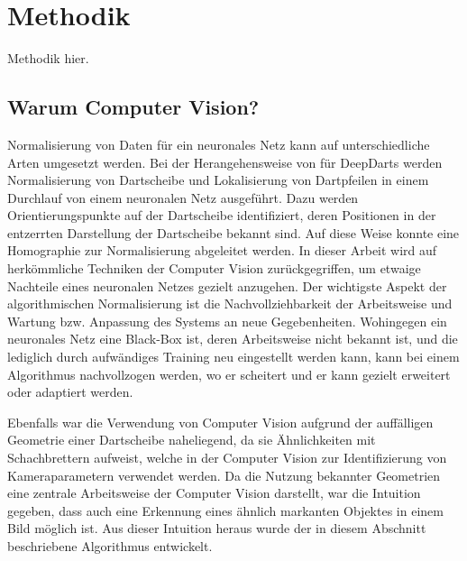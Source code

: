 
\section{Methodik}
\label{sec:cv:methodik}

Methodik hier.


\subsection{Warum Computer Vision?}
\label{sec:warum_cv}

Normalisierung von Daten für ein neuronales Netz kann auf unterschiedliche Arten umgesetzt werden. Bei der Herangehensweise von \citeauthor{deepdarts} für DeepDarts werden Normalisierung von Dartscheibe und Lokalisierung von Dartpfeilen in einem Durchlauf von einem neuronalen Netz ausgeführt. Dazu werden Orientierungspunkte auf der Dartscheibe identifiziert, deren Positionen in der entzerrten Darstellung der Dartscheibe bekannt sind. Auf diese Weise konnte eine Homographie zur Normalisierung abgeleitet werden. In dieser Arbeit wird auf herkömmliche Techniken der Computer Vision zurückgegriffen, um etwaige Nachteile eines neuronalen Netzes gezielt anzugehen. Der wichtigste Aspekt der algorithmischen Normalisierung ist die Nachvollziehbarkeit der Arbeitsweise und Wartung bzw. Anpassung des Systems an neue Gegebenheiten. Wohingegen ein neuronales Netz eine Black-Box ist, deren Arbeitsweise nicht bekannt ist, und die lediglich durch aufwändiges Training neu eingestellt werden kann, kann bei einem Algorithmus nachvollzogen werden, wo er scheitert und er kann gezielt erweitert oder adaptiert werden.

Ebenfalls war die Verwendung von Computer Vision aufgrund der auffälligen Geometrie einer Dartscheibe naheliegend, da sie Ähnlichkeiten mit Schachbrettern aufweist, welche in der Computer Vision zur Identifizierung von Kameraparametern verwendet werden. Da die Nutzung bekannter Geometrien eine zentrale Arbeitsweise der Computer Vision darstellt, war die Intuition gegeben, dass auch eine Erkennung eines ähnlich markanten Objektes in einem Bild möglich ist. Aus dieser Intuition heraus wurde der in diesem Abschnitt beschriebene Algorithmus entwickelt.


